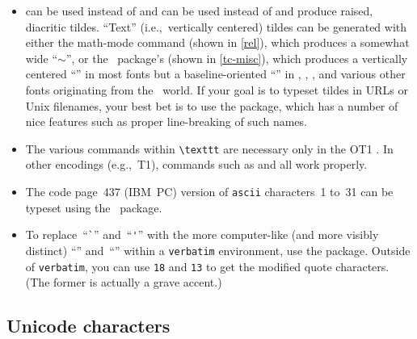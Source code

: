 \begin{itemize}
  \item \label{page:tildes}  
  can be used instead of 
  and
   can be used instead of
   and 
  produce raised, diacritic tildes.  ``Text''
  (i.e.,~vertically centered)
  tildes can be generated with either the math-mode 
  command (shown in \vref{rel}), which produces a somewhat wide
  ``$\sim$'', or the \TC\ package's  (shown in
  \vref{tc-misc}), which produces a vertically centered
  ``{\selectfont\texttildelow}'' in most fonts but a
  baseline-oriented ``\texttildelow'' in ,
  \TX, \PX, and various other fonts originating from the
  \tex\ world.  If your goal is to typeset tildes in URLs or Unix
  filenames, your best bet is to use the  package,
  which has a number of nice features such as proper line-breaking
  of such names.

  \item The various \cmd{\char} commands within \verb|\texttt| are
  necessary only in the OT1 \fntenc[OT1].  In other encodings
  (e.g.,~T1), commands such as 
  and  all work properly.

  \item The code page~437 (IBM~PC)
  version of \texttt{ascii} characters~1 to~31 can be typeset
  using the \ASCII\ package.

  \item To replace~``\verb|`|'' and~``\verb|'|'' with the more
  computer-like (and more visibly distinct) ``\texttt{}''
  and~``\texttt{}'' within a \texttt{verbatim} environment,
  use the  package.  Outside of \texttt{verbatim},
  you can use \cmd{\char}\texttt{18} and \cmd{\char}\texttt{13} to
  get the modified quote characters.  (The former is actually a
  grave accent.)
\end{itemize}





\subsection{Unicode characters}
\label{unicode-chars}

